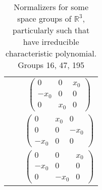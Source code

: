 \documentclass[a4paper,12pt]{amsart}
\theoremstyle{definition}
\begin{document}
\begin{table}[H]
\begin{tabular}{|c|c|c|}
			&  & $\left(\begin{array}{rrr}
				0 & 0 & x_{0} \\
				-x_{0} & 0 & 0 \\
				0 & x_{0} & 0
			\end{array}\right)$ \\
			&  & $\left(\begin{array}{rrr}
				0 & x_{0} & 0 \\
				0 & 0 & -x_{0} \\
				-x_{0} & 0 & 0
			\end{array}\right)$ \\
			&  & $\left(\begin{array}{rrr}
				0 & 0 & x_{0} \\
				-x_{0} & 0 & 0 \\
				0 & -x_{0} & 0
			\end{array}\right)$ \\
		\hline
		\end{tabular}
	\caption{Normalizers for some space groups of $\mathbb{R}^3$, particularly such that have irreducible characteristic polynomial. Groups 16, 47, 195}
	\end{table}

	\newpage
	
\end{document}

